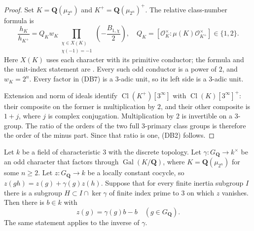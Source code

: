 \begin{proof}
Set $K=\mathbf Q(\mu_{2^n})$ and $K^+=\mathbf Q(\mu_{2^n})^+$.
The relative class-number formula is
\[
 \frac{h_K}{h_{K^+}}=Q_Kw_K
       \prod_{\substack{\chi\in X(K)\\\chi(-1)=-1}}
                                    \left(-\frac{B_{1,\chi}}2\right),
 \quad Q_K=[\mathcal O_K^\times:
                 \mu(K)\mathcal O_{K^+}^\times]\in\{1,2\}.
                                                               \tag{DB7}
\]
Here $X(K)$ uses each character with its primitive conductor;
the formula and the unit-index statement are
\cite[Theorem 4.2.20 and Lemma 4.2.16]{dyadic-bernoulli-sharifi}.
Every such odd conductor is a power of $2$, and $w_K=2^n$.
Every factor in (DB7) is a $3$-adic unit, so its left side is
a $3$-adic unit.

Extension and norm of ideals identify
$\operatorname{Cl}(K^+)[3^\infty]$ with
$\operatorname{Cl}(K)[3^\infty]^+$: their composite on the
former is multiplication by $2$, and their other composite
is $1+j$, where $j$ is complex conjugation.  Multiplication
by $2$ is invertible on a $3$-group.  The ratio of the orders
of the two full $3$-primary class groups is therefore the
order of the minus part.  Since that ratio is one, (DB2) follows.
\end{proof}

\begin{corollary}
\label{cor:dyadic-three-unramified-vanishing}
Let $k$ be a field of characteristic $3$ with the discrete topology.
Let $\gamma:G_{\mathbf Q}\longrightarrow k^\times$ be an odd
character that factors through $\operatorname{Gal}(K/\mathbf Q)$,
where $K=\mathbf Q(\mu_{2^n})$ for some $n\ge2$.
Let $z:G_{\mathbf Q}\longrightarrow k$ be a locally constant
cocycle, so
$z(gh)=z(g)+\gamma(g)z(h)$.
Suppose that for every finite inertia subgroup $I$ there is
a subgroup $H\subset I\cap\ker\gamma$ of finite index prime
to $3$ on which $z$ vanishes.  Then there is $b\in k$ with
\[
                         z(g)=\gamma(g)b-b
                                      \quad(g\in G_{\mathbf Q}).
                                                               \tag{DB8}
\]
The same statement applies to the inverse of $\gamma$.
\end{corollary}

